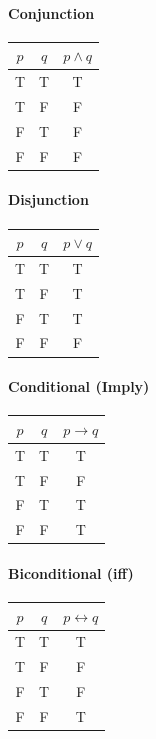 \documentclass[oneside]{book}
\begin{document}
\paragraph{Conjunction}
\begin{center}
\begin{tabular}{cc|c}
\toprule
$p$ & $q$ & $p \wedge q$ \\
\midrule
T & T & T \\
T & F & F \\
F & T & F \\
F & F & F \\
\bottomrule
\end{tabular}
\end{center}

\newpage

\paragraph{Disjunction}
\begin{center}
\begin{tabular}{cc|c}
\toprule
$p$ & $q$ & $p \vee q$ \\
\midrule
T & T & T \\
T & F & T \\
F & T & T \\
F & F & F \\
\bottomrule
\end{tabular}
\end{center}

\paragraph{Conditional (Imply)}
\begin{center}
\begin{tabular}{cc|c}
\toprule
$p$ & $q$ & $p \to q$ \\
\midrule
T & T & T \\
T & F & F \\
F & T & T \\
F & F & T \\
\bottomrule
\end{tabular}
\end{center}

\paragraph{Biconditional (iff)}
\begin{center}
\begin{tabular}{cc|c}
\toprule
$p$ & $q$ & $p \leftrightarrow q$ \\
\midrule
T & T & T \\
T & F & F \\
F & T & F \\
F & F & T \\
\bottomrule
\end{tabular}
\end{center}
\end{document}
